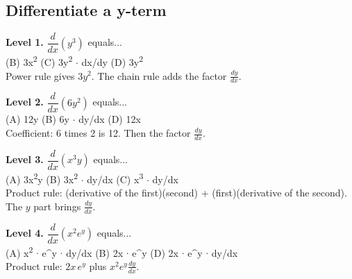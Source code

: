 \documentclass[11pt]{article}
\begin{document}
\subsection*{Differentiate a y-term}
\noindent\textbf{Level 1.} $\dfrac{d}{dx}\left(y^{3}\right)$ equals...\\  \quad (B) 3x\textsuperscript{2} \quad (C) 3y\textsuperscript{2} $\cdot$ dx/dy \quad (D) 3y\textsuperscript{2}\\  \quad Power rule gives $3y^{2}$. The chain rule adds the factor $\frac{dy}{dx}$.\par\medskip
\noindent\textbf{Level 2.} $\dfrac{d}{dx}\left(6y^{2}\right)$ equals...\\ (A) 12y \quad (B) 6y $\cdot$ dy/dx \quad {} \quad (D) 12x\\  \quad Coefficient: 6 times 2 is 12. Then the factor $\frac{dy}{dx}$.\par\medskip
\noindent\textbf{Level 3.} $\dfrac{d}{dx}\left(x^{3}y\right)$ equals...\\ (A) 3x\textsuperscript{2}y \quad (B) 3x\textsuperscript{2} $\cdot$ dy/dx \quad (C) x\textsuperscript{3} $\cdot$ dy/dx \quad {}\\  \quad Product rule: (derivative of the first)(second) + (first)(derivative of the second). The $y$ part brings $\frac{dy}{dx}$.\par\medskip
\noindent\textbf{Level 4.} $\dfrac{d}{dx}\left(x^{2}e^{y}\right)$ equals...\\ (A) x\textsuperscript{2} $\cdot$ e\textasciicircum{}y $\cdot$ dy/dx \quad (B) 2x $\cdot$ e\textasciicircum{}y \quad {} \quad (D) 2x $\cdot$ e\textasciicircum{}y $\cdot$ dy/dx\\  \quad Product rule: $2x\,e^{y}$ plus $x^{2}e^{y}\frac{dy}{dx}$.\par\medskip
\end{document}
